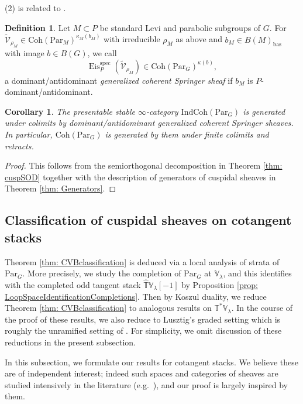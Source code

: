 \documentclass{amsart}
\newtheorem{corollary}[theorem]{Corollary}
\theoremstyle{definition}
\newtheorem{definition}[theorem]{Definition}
\theoremstyle{remark}
\numberwithin{equation}{section}
\newcommand{\mc}{\mathcal}
\newcommand{\bas}{\mathrm{bas}}
\newcommand{\spec}{\mathrm{spec}}
\newcommand{\wh}{\widehat}
\newcommand{\Par}{\mathrm{Par}}
\newcommand{\IndCoh}{\mathrm{IndCoh}}
\DeclareMathOperator{\Eis}{\mathrm{Eis}}
\newcommand{\Coh}{\mathrm{Coh}}
\newcommand{\V}{\mathbb{V}}
\newcommand{\T}{\mathbb{T}}
\begin{document}
(2) is related to \cite[Conjecture 4.2.3]{AbeOhara}.

\begin{definition}
Let $M \subset P$ be standard Levi and parabolic subgroups of $G$. For $\widetilde{\mc V}_{\rho_M} \in \Coh(\Par_M)^{\kappa_M(b_M)}$ with irreducible $\rho_M$ as above and $b_M \in B(M)_{\bas}$ with image $b \in B(G)$, we call 
\[
\Eis_P^{\spec} (\widetilde{\mc V}_{\rho_M}) \in \Coh(\Par_G)^{\kappa(b)},
\]
a dominant/antidominant \emph{generalized coherent Springer sheaf} if $b_M$ is $P$-dominant/antidominant. 
\end{definition}

\begin{corollary}{\label{cor: ParGgenbycohspringer}}
The presentable stable $\infty$-category $\IndCoh (\Par_G)$ is generated under colimits by dominant/antidominant generalized coherent Springer sheaves. In particular, $\Coh (\Par_G)$ is generated by them under finite colimits and retracts.
\end{corollary}
\begin{proof}
    This follows from the semiorthogonal decomposition in Theorem \ref{thm: cuspSOD} together with the description of generators of cuspidal sheaves in Theorem \ref{thm: Generators}. 
\end{proof}

\subsection{Classification of cuspidal sheaves on cotangent stacks}

Theorem \ref{thm: CVBclassification} is deduced via a local analysis of strata of $\Par_G$. More precisely, we study the completion of $\Par_G$ at $\V_{\lambda}$, and this identifies with the completed odd tangent stack $\wh{\T}\V_{\lambda}[-1]$ by Proposition \ref{prop: LoopSpaceIdentificationCompletions}. Then by Koszul duality, we reduce Theorem \ref{thm: CVBclassification} to analogous results on $\T^{\ast} \V_{\lambda}$. In the course of the proof of these results, we also reduce to Lusztig's graded setting which is roughly the unramified setting of \cite[\S5]{CFMMX}. For simplicity, we omit discussion of these reductions in the present subsection. 

In this subsection, we formulate our results for cotangent stacks. We believe these are of independent interest; indeed such spaces and categories of sheaves are studied intensively in the literature (e.g.~\cite{PTDolbeault, BuPadurariuToda}), and our proof is largely inspired by them. 
\end{document}
